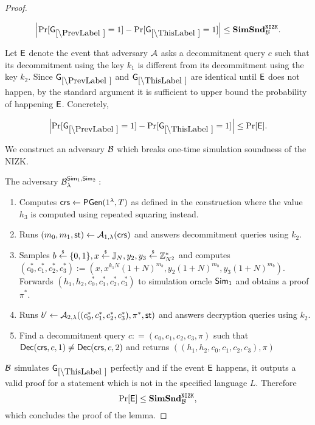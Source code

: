 \begin{proof}
\begin{lemma}
\[
\left|\Pr[\games_\prevgame = 1] - \Pr[\games_\thisgame = 1]\right| \leq \simsnd^\nizk_\advB. 
\]
\end{lemma}

Let $\mathsf{E}$ denote the event that adversary $\mathcal{A}$ asks a decommitment query $c$ such that its decommitment using the key $k_1$ is different from its decommitment using the key $k_2$. Since $\games_\prevgame$ and $\games_\thisgame$ are identical until $\mathsf{E}$ does not happen, by the standard argument it is sufficient to upper bound the probability of happening $\mathsf{E}$. Concretely,  

\[
\left|\Pr[\games_\prevgame = 1] - \Pr[\games_\thisgame = 1]\right| \leq \Pr[\event]. 
\]

We construct an adversary $\mathcal{B}$ which breaks one-time simulation soundness of the NIZK. 

The adversary $\mathcal{B}_{\lambda}^{\mathsf{Sim}_1, \mathsf{Sim}_2}:$
\vspace{-2mm}
\begin{enumerate}
\item Computes $\mathsf{crs} \leftarrow \mathsf{PGen}(1{^{\lambda}}, T)$ as defined in the construction where the value $h_3$ is computed using repeated squaring instead.
\item Runs $(m_0, m_1, \mathsf{st}) \leftarrow \mathcal{A}_{1, \lambda}(\mathsf{crs})$ and answers decommitment queries using $k_2$.
\item Samples $b \stackrel{{\scriptscriptstyle\$}}{\leftarrow} \{0,1\}, x \stackrel{{\scriptscriptstyle\$}}{\leftarrow} \mathbb{J}_N, y_2, y_3 \stackrel{{\scriptscriptstyle\$}}{\leftarrow} \mathbb{Z}_{N^2}^*$ and computes $(c_0^*, c_1^*, c_2^*, c_3^*):=(x, x^{k_1 N} (1+N)^{m_b}, y_2 (1+N)^{m_b}, y_3 (1+N)^{m_b})$. Forwards $(h_1, h_2, c_0^*, c_1^*, c_2^*, c_3^*)$ to simulation oracle $\mathsf{Sim}_1$ and obtains a proof $\pi^*$.
\item Runs $b' \leftarrow \mathcal{A}_{2, \lambda}((c_0^*, c_1^*, c_2^*, c_3^*), \pi^*, \mathsf{st})$ and answers decryption queries using $k_2$.
\item Find a decommitment query $c: = (c_0, c_1, c_2, c_3, \pi)$ such that $\mathsf{Dec}(\mathsf{crs}, c, 1) \neq \mathsf{Dec}(\mathsf{crs},c,2)$ and returns $((h_1, h_2, c_0, c_1, c_2, c_3), \pi)$
\end{enumerate}

$\mathcal{B}$ simulates $\games_\thisgame$ perfectly and if the event $\mathsf{E}$ happens, it outputs a valid proof for a statement which is not in the specified language $L$. Therefore
\[\Pr[\mathsf{E}] \leq \mathbf{SimSnd}^{\mathtt{NIZK}}_{\mathcal{B}},\]
which concludes the proof of the lemma.  

%
%
%


\end{proof}
